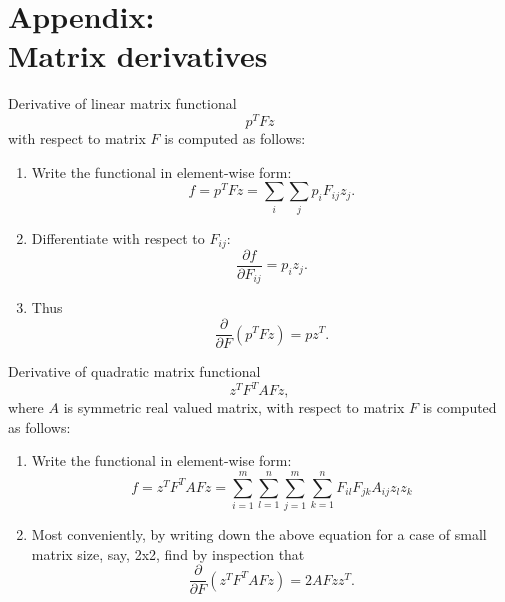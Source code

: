 
\newpage
\section{Appendix: \\ Matrix derivatives}
\label{sec:MDerivative}

Derivative of linear matrix functional $$p^T F z$$ with respect to matrix $F$
is computed as follows:
\begin{enumerate}
 \item Write the functional in element-wise form:
   $$ f = p^T F z = \sum_i \sum_j p_i F_{ij} z_j. $$
 \item Differentiate with respect to $F_{ij}$:
    $$ \frac{\partial f}{\partial F_{ij}} = p_i z_j. $$
 \item Thus $$ \frac{\partial}{\partial F} (p^T F z) = p z^T. $$
\end{enumerate}

Derivative of quadratic matrix functional $$z^T F^T A F z,$$ where $A$ is
symmetric real valued matrix, with respect to matrix $F$ is computed as follows:
\begin{enumerate}
 \item Write the functional in element-wise form:
    $$ f = z^T F^T A F z = \sum_{i=1}^m \sum_{l=1}^n \sum_{j=1}^m \sum_{k=1}^n
    F_{il} F_{jk} A_{ij} z_l z_k $$
 \item Most conveniently, by writing down the above equation for a case of
 small matrix size, say, 2x2, find by inspection that
    $$ \frac{\partial}{\partial F} (z^T F^T A F z) = 2 A F zz^T. $$
\end{enumerate}
